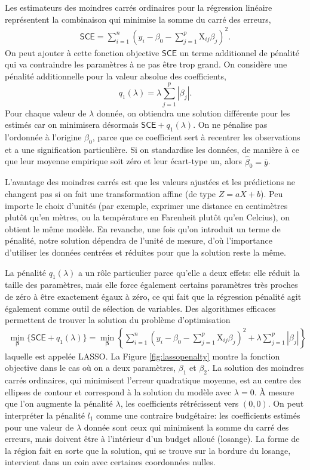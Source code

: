 \documentclass[
  11pt,
  letterpaper,
]{book}
\theoremstyle{definition}
\theoremstyle{definition}
\theoremstyle{definition}
\theoremstyle{remark}
\begin{document}
Les estimateurs des moindres carrés ordinaires pour la régression linéaire représentent la combinaison qui minimise la somme du carré des erreurs,
\begin{align*}
\mathsf{SCE} = \sum_{i=1}^n \left(y_i - \beta_0 - \sum_{j=1}^p\mathrm{X}_{ij}\beta_{j}\right)^2.
\end{align*}
On peut ajouter à cette fonction objective \(\mathsf{SCE}\) un terme additionnel de pénalité qui va contraindre les paramètres à ne pas être trop grand. On considère une pénalité additionnelle pour la valeur absolue des coefficients, \[
q_1(\lambda) = \lambda \sum_{j=1}^p |\beta_j|.
\]
Pour chaque valeur de \(\lambda\) donnée, on obtiendra une solution différente pour les estimés car on minimisera désormais \(\mathsf{SCE} + q_1(\lambda)\). On ne pénalise pas l'ordonnée à l'origine \(\beta_0\), parce que ce coefficient sert à recentrer les observations et a une signification particulière. Si on standardise les données, de manière à ce que leur moyenne empirique soit zéro et leur écart-type un, alors \(\widehat{\beta}_0 = \overline{y}\).

L'avantage des moindres carrés est que les valeurs ajustées et les prédictions ne changent pas si on fait une transformation affine (de type \(Z = aX+b\)).
Peu importe le choix d'unités (par exemple, exprimer une distance en centimètres plutôt qu'en mètres, ou la température en Farenheit plutôt qu'en Celcius), on obtient le même modèle. En revanche, une fois qu'on introduit un terme de pénalité, notre solution dépendra de l'unité de mesure, d'où l'importance d'utiliser les données centrées et réduites pour que la solution reste la même.

La pénalité \(q_1(\lambda)\) a un rôle particulier parce qu'elle a deux effets: elle réduit la taille des paramètres, mais elle force également certains paramètres très proches de zéro à être exactement égaux à zéro, ce qui fait que la régression pénalité agit également comme outil de sélection de variables. Des algorithmes efficaces permettent de trouver la solution du problème d'optimisation
\begin{align*}
\min_{\boldsymbol{\beta}} \{\mathsf{SCE} + q_1(\lambda)\} = \min_{\boldsymbol{\beta}}  \left\{\sum_{i=1}^n \left(y_i - \beta_0 - \sum_{j=1}^p\mathrm{X}_{ij}\beta_{j}\right)^2 +
\lambda \sum_{j=1}^p |\beta_j|\right\}
\end{align*}
laquelle est appelée LASSO. La Figure \ref{fig:lassopenalty} montre la fonction objective dans le cas où on a deux paramètres, \(\beta_1\) et \(\beta_2\). La solution des moindres carrés ordinaires, qui minimisent l'erreur quadratique moyenne, est au centre des ellipses de contour et correspond à la solution du modèle avec \(\lambda=0\). À mesure que l'on augmente la pénalité \(\lambda\), les coefficients rétrécissent vers \((0, 0)\). On peut interpréter la pénalité \(l_1\) comme une contraire budgétaire: les coefficients estimés pour une valeur de \(\lambda\) donnée sont ceux qui minimisent la somme du carré des erreurs, mais doivent être à l'intérieur d'un budget alloué (losange). La forme de la région fait en sorte que la solution, qui se trouve sur la bordure du losange, intervient dans un coin avec certaines coordonnées nulles.
\end{document}
